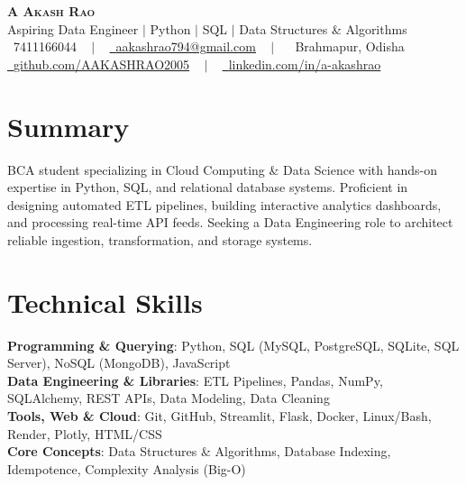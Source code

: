 \documentclass[letterpaper,10pt]{article}
\newcommand{\resumeSubHeadingListStart}{\begin{itemize}[leftmargin=0.12in, label={}, itemsep=1pt, topsep=1pt, parsep=0pt]}
\newcommand{\resumeSubHeadingListEnd}{\end{itemize}\vspace{-2pt}}
\begin{document}
\begin{center}
    \textbf{\LARGE \scshape A Akash Rao} \\ \vspace{2pt}
    \small Aspiring Data Engineer $\vert$ Python $\vert$ SQL $\vert$ Data Structures \& Algorithms \\ \vspace{2pt}
    \small \raisebox{-0.1\height}\faPhone\ 7411166044 ~ $\vert$ ~
    \href{mailto:aakashrao794@gmail.com}{\raisebox{-0.2\height}\faEnvelope\ \underline{aakashrao794@gmail.com}} ~ $\vert$ ~
    \raisebox{-0.1\height}\faMapMarker\ Brahmapur, Odisha \\ \vspace{2pt}
    \small \href{https://github.com/AAKASHRAO2005}{\raisebox{-0.2\height}\faGithub\ \underline{github.com/AAKASHRAO2005}} ~ $\vert$ ~
    \href{https://www.linkedin.com/in/a-akashrao-a57586324/}{\raisebox{-0.2\height}\faLinkedin\ \underline{linkedin.com/in/a-akashrao}}
\end{center}
\vspace{-8pt}

\section{Summary}
  \resumeSubHeadingListStart
    \small{\item{
      BCA student specializing in Cloud Computing \& Data Science with hands-on expertise in Python, SQL, and relational database systems. Proficient in designing automated ETL pipelines, building interactive analytics dashboards, and processing real-time API feeds. Seeking a Data Engineering role to architect reliable ingestion, transformation, and storage systems.
    }}
  \resumeSubHeadingListEnd

\section{Technical Skills}
 \resumeSubHeadingListStart
    \small{\item{
     \textbf{Programming \& Querying}{: Python, SQL (MySQL, PostgreSQL, SQLite, SQL Server), NoSQL (MongoDB), JavaScript} \\
     \textbf{Data Engineering \& Libraries}{: ETL Pipelines, Pandas, NumPy, SQLAlchemy, REST APIs, Data Modeling, Data Cleaning} \\
     \textbf{Tools, Web \& Cloud}{: Git, GitHub, Streamlit, Flask, Docker, Linux/Bash, Render, Plotly, HTML/CSS} \\
     \textbf{Core Concepts}{: Data Structures \& Algorithms, Database Indexing, Idempotence, Complexity Analysis (Big-O)}
    }}
 \resumeSubHeadingListEnd
\end{document}
